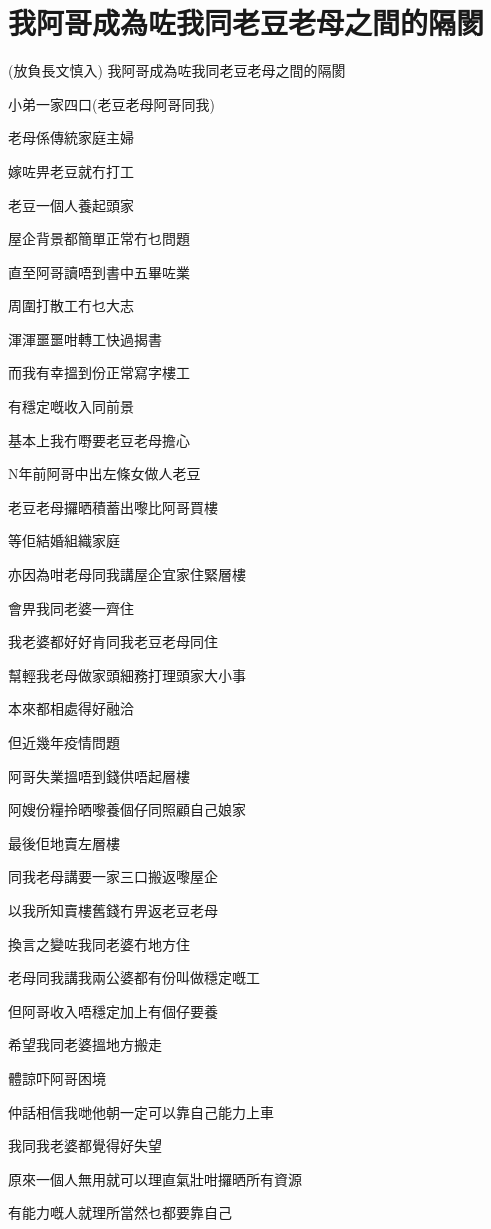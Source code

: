 \chapter{我阿哥成為咗我同老豆老母之間的隔閡}

(放負長文慎入) 我阿哥成為咗我同老豆老母之間的隔閡

小弟一家四口(老豆老母阿哥同我)

老母係傳統家庭主婦

嫁咗畀老豆就冇打工

老豆一個人養起頭家

屋企背景都簡單正常冇乜問題

直至阿哥讀唔到書中五畢咗業

周圍打散工冇乜大志

渾渾噩噩咁轉工快過揭書

而我有幸搵到份正常寫字樓工

有穩定嘅收入同前景

基本上我冇嘢要老豆老母擔心

N年前阿哥中出左條女做人老豆

老豆老母攞晒積蓄出嚟比阿哥買樓

等佢結婚組織家庭

亦因為咁老母同我講屋企宜家住緊層樓

會畀我同老婆一齊住

我老婆都好好肯同我老豆老母同住

幫輕我老母做家頭細務打理頭家大小事

本來都相處得好融洽

但近幾年疫情問題

阿哥失業搵唔到錢供唔起層樓

阿嫂份糧拎晒嚟養個仔同照顧自己娘家

最後佢地賣左層樓

同我老母講要一家三口搬返嚟屋企

以我所知賣樓舊錢冇畀返老豆老母

換言之變咗我同老婆冇地方住

老母同我講我兩公婆都有份叫做穩定嘅工

但阿哥收入唔穩定加上有個仔要養

希望我同老婆搵地方搬走

體諒吓阿哥困境

仲話相信我哋他朝一定可以靠自己能力上車

我同我老婆都覺得好失望

原來一個人無用就可以理直氣壯咁攞晒所有資源

有能力嘅人就理所當然乜都要靠自己

